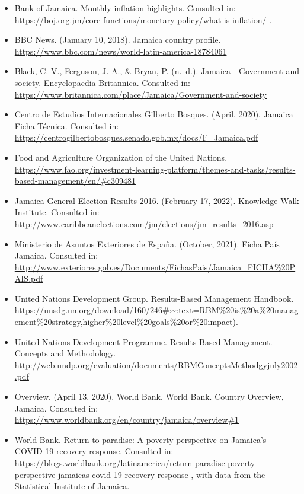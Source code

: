 \documentclass[
  10pt,
]{book}
\begin{document}
\begin{itemize}
\item
  Bank of Jamaica. Monthly inflation highlights. Consulted in: \url{https://boj.org.jm/core-functions/monetary-policy/what-is-inflation/} .
\item
  BBC News. (January 10, 2018). Jamaica country profile. \url{https://www.bbc.com/news/world-latin-america-18784061}
\item
  Black, C. V., Ferguson, J. A., \& Bryan, P. (n.~d.). Jamaica - Government and society. Encyclopaedia Britannica. Consulted in: \url{https://www.britannica.com/place/Jamaica/Government-and-society}
\item
  Centro de Estudios Internacionales Gilberto Bosques. (April, 2020). Jamaica Ficha Técnica. Consulted in: \url{https://centrogilbertobosques.senado.gob.mx/docs/F_Jamaica.pdf}
\item
  Food and Agriculture Organization of the United Nations. \url{https://www.fao.org/investment-learning-platform/themes-and-tasks/results-based-management/en/\#c309481}
\item
  Jamaica General Election Results 2016. (February 17, 2022). Knowledge Walk Institute. Consulted in: \url{http://www.caribbeanelections.com/jm/elections/jm_results_2016.asp}
\item
  Ministerio de Asuntos Exteriores de España. (October, 2021). Ficha País Jamaica. Consulted in: \url{http://www.exteriores.gob.es/Documents/FichasPais/Jamaica_FICHA\%20PAIS.pdf}
\item
  United Nations Development Group. Results-Based Management Handbook. \url{https://unsdg.un.org/download/160/246\#}:\textasciitilde:text=RBM\%20is\%20a\%20management\%20strategy,higher\%20level\%20goals\%20or\%20impact).
\item
  United Nations Development Programme. Results Based Management. Concepts and Methodology. \url{http://web.undp.org/evaluation/documents/RBMConceptsMethodgyjuly2002.pdf}
\item
  Overview. (April 13, 2020). World Bank.
  World Bank. Country Overview, Jamaica. Consulted in: \url{https://www.worldbank.org/en/country/jamaica/overview\#1}
\item
  World Bank. Return to paradise: A poverty perspective on Jamaica's COVID-19 recovery response. Consulted in: \url{https://blogs.worldbank.org/latinamerica/return-paradise-poverty-perspective-jamaicas-covid-19-recovery-response} , with data from the Statistical Institute of Jamaica.
\end{itemize}
\end{document}
